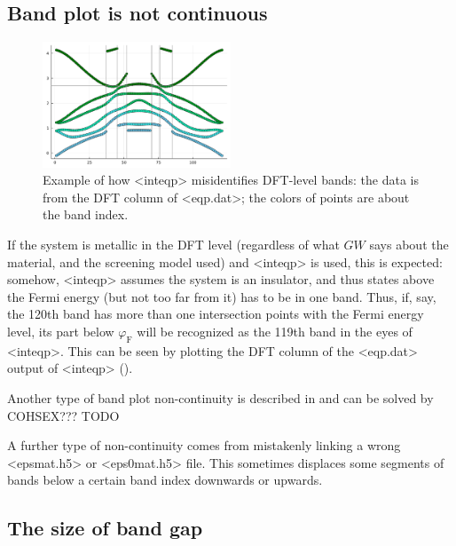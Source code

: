 \documentclass[hyperref, a4paper]{report}
\def\texttt#1{<#1>}%
\newcommand{\shortcode}[1]{\texttt{#1}}
\begin{document}
\subsection{Band plot is not continuous}\label{sec:discontinuous-band}

\begin{figure}
    \centering
    \includegraphics[width=0.5\textwidth]{plots/dft-level-bands.pdf}
    \caption{Example of how \shortcode{inteqp} misidentifies DFT-level bands:
    the data is from the DFT column of \shortcode{eqp.dat};
    the colors of points are about the band index.}
    \label{fig:inteqp-shuffle-band-index-1}
\end{figure}

If the system is metallic in the DFT level 
(regardless of what $GW$ says about the material, 
and the screening model used)
and \shortcode{inteqp} is used, 
this is expected:
somehow, \shortcode{inteqp} assumes the system is an insulator,
and thus states above the Fermi energy (but not too far from it)
has to be in one band.
Thus, if, say, the 120th band has more than one intersection points 
with the Fermi energy level,
its part below $\varphi_{\text{F}}$ will be recognized as the 119th band
in the eyes of \shortcode{inteqp}.
This can be seen by plotting the DFT column of the \shortcode{eqp.dat} output of \shortcode{inteqp}
().

Another type of band plot non-continuity is described in \cite{berger2020potential} 
and can be solved by COHSEX??? TODO

A further type of non-continuity comes from mistakenly linking a wrong \shortcode{epsmat.h5} 
or \shortcode{eps0mat.h5} file.
This sometimes displaces some segments of bands below a certain band index downwards or upwards.

\subsection{The size of band gap}\label{sec:band-gap-problem}
\end{document}
